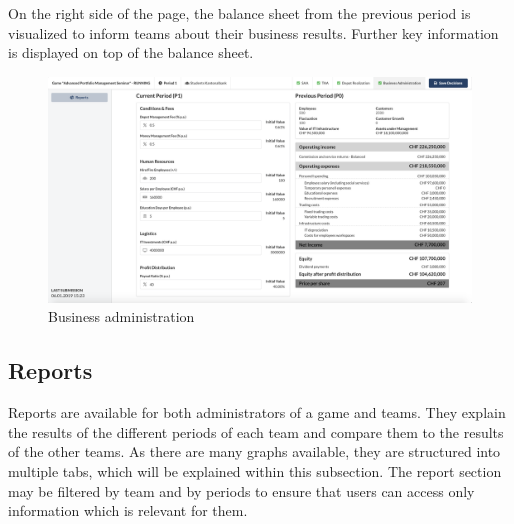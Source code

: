 On the right side of the page, the balance sheet from the previous period is visualized to inform teams about their business results. Further key information is displayed on top of the balance sheet.
\begin{figure}[h!]
  \centering
  \includegraphics[scale=0.2]{img/application-overview/teams/06_business.png}
  \caption{Business administration}
\end{figure}

\subsection{Reports}
\label{subsec:reports}
Reports are available for both administrators of a game and teams. They explain the results of the different periods of each team and compare them to the results of the other teams. As there are many graphs available, they are structured into multiple tabs, which will be explained within this subsection. The report section may be filtered by team and by periods to ensure that users can access only information which is relevant for them.

